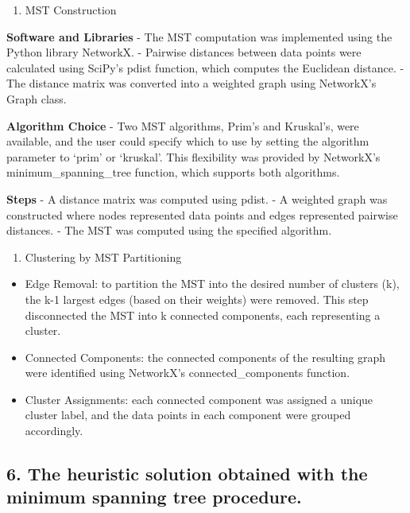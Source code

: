 \documentclass[
]{article}
\providecommand{\tightlist}{%
  \setlength{\itemsep}{0pt}\setlength{\parskip}{0pt}}
\begin{document}
\begin{enumerate}
\def\labelenumi{\arabic{enumi}.}
\tightlist
\item
  MST Construction
\end{enumerate}

\textbf{Software and Libraries} - The MST computation was implemented
using the Python library NetworkX. - Pairwise distances between data
points were calculated using SciPy's pdist function, which computes the
Euclidean distance. - The distance matrix was converted into a weighted
graph using NetworkX's Graph class.

\textbf{Algorithm Choice} - Two MST algorithms, Prim's and Kruskal's,
were available, and the user could specify which to use by setting the
algorithm parameter to `prim' or `kruskal'. This flexibility was
provided by NetworkX's minimum\_spanning\_tree function, which supports
both algorithms.

\textbf{Steps} - A distance matrix was computed using pdist. - A
weighted graph was constructed where nodes represented data points and
edges represented pairwise distances. - The MST was computed using the
specified algorithm.

\begin{enumerate}
\def\labelenumi{\arabic{enumi}.}
\tightlist
\item
  Clustering by MST Partitioning
\end{enumerate}

\begin{itemize}
\tightlist
\item
  Edge Removal: to partition the MST into the desired number of clusters
  (k), the k-1 largest edges (based on their weights) were removed. This
  step disconnected the MST into k connected components, each
  representing a cluster.
\item
  Connected Components: the connected components of the resulting graph
  were identified using NetworkX's connected\_components function.
\item
  Cluster Assignments: each connected component was assigned a unique
  cluster label, and the data points in each component were grouped
  accordingly.
\end{itemize}

\subsection{6. The heuristic solution obtained with the minimum spanning
tree
procedure.}\label{the-heuristic-solution-obtained-with-the-minimum-spanning-tree-procedure.}
\end{document}

